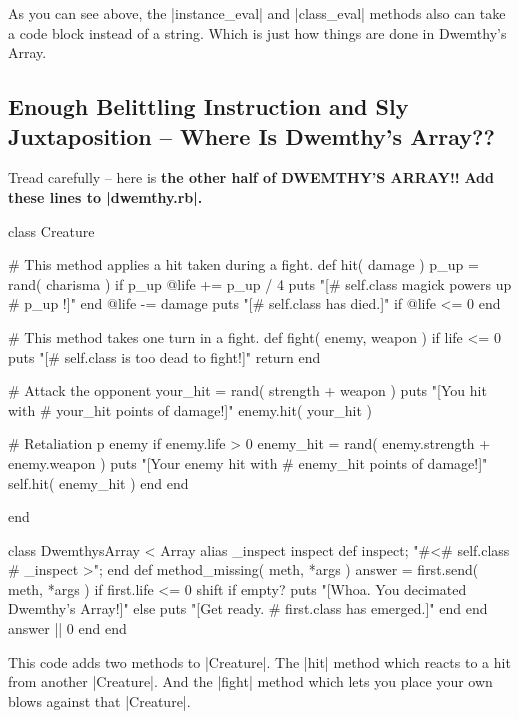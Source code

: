 \documentclass[12pt,twoside]{report}
\begin{document}
As you can see above, the \rubyinline|instance_eval|
and \rubyinline|class_eval| methods also can take a
code block instead of a string.  Which is just how things are done in
Dwemthy's Array.



\subsection{Enough Belittling Instruction and Sly Juxtaposition -- Where Is Dwemthy's Array??}



Tread carefully -- here is {\bf the other half of DWEMTHY'S ARRAY!!}
{\bf Add these lines to \rubyinline|dwemthy.rb|.}


\begin{rubycode}

 class Creature

   # This method applies a hit taken during a fight.
   def hit( damage )
     p_up = rand( charisma )
     if p_up %
       @life += p_up / 4
       puts "[#{ self.class } magick powers up #{ p_up }!]"
     end
     @life -= damage
     puts "[#{ self.class } has died.]" if @life <= 0
   end

   # This method takes one turn in a fight.
   def fight( enemy, weapon )
     if life <= 0
       puts "[#{ self.class } is too dead to fight!]"
       return
     end

     # Attack the opponent
     your_hit = rand( strength + weapon )
     puts "[You hit with #{ your_hit } points of damage!]"
     enemy.hit( your_hit )

     # Retaliation
     p enemy
     if enemy.life > 0
       enemy_hit = rand( enemy.strength + enemy.weapon )
       puts "[Your enemy hit with #{ enemy_hit } points of damage!]"
       self.hit( enemy_hit )
     end
   end

 end

 class DwemthysArray < Array
   alias _inspect inspect
   def inspect; "#<#{ self.class }#{ _inspect }>"; end
   def method_missing( meth, *args )
     answer = first.send( meth, *args )
     if first.life <= 0
       shift
       if empty?
         puts "[Whoa.  You decimated Dwemthy's Array!]"
       else
         puts "[Get ready. #{ first.class } has emerged.]"
       end
     end
     answer || 0
   end
 end

\end{rubycode}


This code adds two methods to \rubyinline|Creature|.
The \rubyinline|hit| method which reacts to a hit from
another \rubyinline|Creature|.  And the
\rubyinline|fight| method which lets you place your
own blows against that \rubyinline|Creature|.
\end{document}
